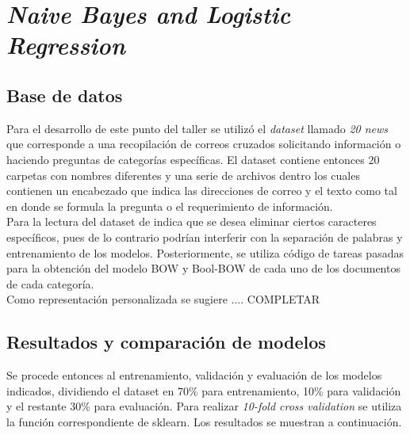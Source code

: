 \section{\textit{Naive Bayes and Logistic Regression}}

\subsection{Base de datos}
Para el desarrollo de este punto del taller se utilizó el \textit{dataset} llamado \textit{20 news} que corresponde a una recopilación de correos cruzados solicitando información o haciendo preguntas de categorías específicas. El dataset contiene entonces 20 carpetas con nombres diferentes y una serie de archivos dentro los cuales contienen un encabezado que indica las direcciones de correo y el texto como tal en donde se formula la pregunta o el requerimiento de información.\\

Para la lectura del dataset de indica que se desea eliminar ciertos caracteres específicos, pues de lo contrario podrían interferir con la separación de palabras y entrenamiento de los modelos. Posteriormente, se utiliza código de tareas pasadas para la obtención del modelo BOW y Bool-BOW de cada uno de los documentos de cada categoría.\\

Como representación personalizada se sugiere .... COMPLETAR 

\subsection{Resultados y comparación de modelos}
Se procede entonces al entrenamiento, validación y evaluación de los modelos indicados, dividiendo el dataset en 70\% para entrenamiento, 10\% para validación y el restante 30\% para evaluación. Para realizar \textit{10-fold cross validation} se utiliza la función correspondiente de sklearn. Los resultados se muestran a continuación.


